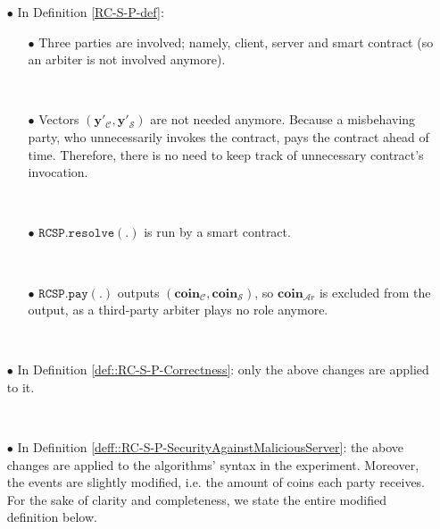 \begin{itemize}

\item[$\bullet$] In Definition \ref{RC-S-P-def}: 
\begin{itemize}



\item [$\bullet$]  Three parties are involved; namely, client, server and smart contract (so an arbiter is not involved anymore). 

\

\item [$\bullet$]  Vectors $(\bm{y}'_{\scriptscriptstyle\mathcal{C}},\bm{y}'_{\scriptscriptstyle\mathcal{S}})$ are not needed anymore. Because a misbehaving party, who unnecessarily invokes the contract, pays the contract ahead of time. Therefore, there is no need to keep track of unnecessary contract's invocation. 




\

\item [$\bullet$] $\mathtt{RCSP}.\mathtt{resolve}(.)$ is run by a smart contract. 

\

\item [$\bullet$] $\mathtt{RCSP}.\mathtt{pay}(.)$ outputs $({\bm{coin}}_{\scriptscriptstyle\mathcal C},{\bm{coin}}_{\scriptscriptstyle\mathcal S})$, so ${\bm{coin}}_{\scriptscriptstyle\mathcal{A}r}$ is excluded from the output, as a third-party arbiter plays no role anymore.
\end{itemize}

\

\item [$\bullet$] In Definition \ref{def::RC-S-P-Correctness}: only the above changes are applied to it. 

\

\item [$\bullet$] In Definition \ref{deff::RC-S-P-SecurityAgainstMaliciousServer}:  the above changes are applied to the algorithms' syntax in the experiment. Moreover, the events are slightly modified, i.e. the amount of coins each party receives. For the sake of clarity and completeness, we state the entire modified  definition below. 


\end{itemize}
